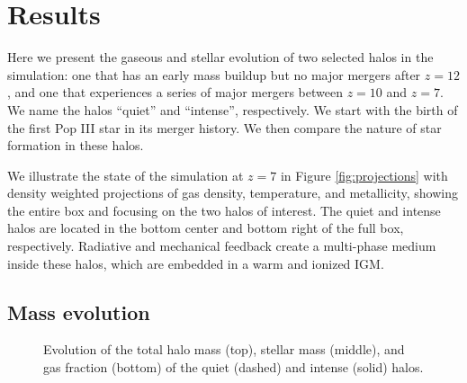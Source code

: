 \documentclass[apjl]{emulateapj}
\begin{document}
\section{Results}
\label{sec:results}

\begin{figure*}
  \caption{\label{fig:projections} Density-weighted projections of gas
    density (top), temperature (middle), and metallicity (bottom) at
    $z=7$.  The left column shows the entire simulation volume, where
    the center and right columns focus on the intense and quiet halos,
    respectively.  The metallicity projections are a composite picture
    of metals originating from Pop III (red) and Pop II (blue) stars.}
\end{figure*}

Here we present the gaseous and stellar evolution of two selected
halos in the simulation: one that has an early mass buildup but no
major mergers after $z=12$, and one that experiences a series of major
mergers between $z=10$ and $z=7$.  We name the halos ``quiet'' and
``intense'', respectively.  We start with the birth of the first Pop
III star in its merger history.  We then compare the nature of star
formation in these halos.

We illustrate the state of the simulation at $z=7$ in Figure
\ref{fig:projections} with density weighted projections of gas
density, temperature, and metallicity, showing the entire box and
focusing on the two halos of interest.  The quiet and intense halos
are located in the bottom center and bottom right of the full box,
respectively.  Radiative and mechanical feedback create a multi-phase
medium inside these halos, which are embedded in a warm and ionized
IGM.

\subsection{Mass evolution}
\label{sec:halo}

\begin{figure}
  \caption{\label{fig:evo} Evolution of the total halo mass (top),
    stellar mass (middle), and gas fraction (bottom) of the quiet
    (dashed) and intense (solid) halos.}
\end{figure}

\end{document}
